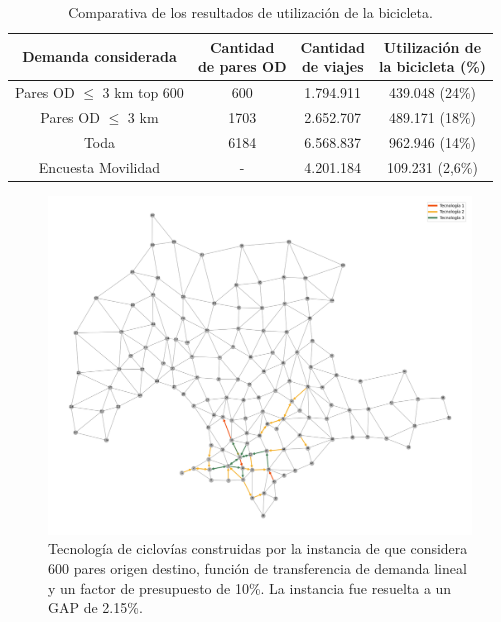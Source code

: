 \begin{table}[h!]
  \centering
  \begin{tabular}{cccc}
    \toprule
      Demanda considerada & \shortstack{Cantidad \\ de pares OD} & \shortstack{Cantidad \\ de viajes} & \shortstack{Utilización de \\ la bicicleta} (\%) \\
    \midrule
      Pares OD $\leq$ 3 km top 600 & 600   & 1.794.911 & 439.048 (24\%)  \\
      Pares OD $\leq$ 3 km         & 1703  & 2.652.707 & 489.171 (18\%)  \\
      Toda                         & 6184  & 6.568.837 & 962.946 (14\%)  \\
    \midrule
      Encuesta Movilidad           & -     & 4.201.184 & 109.231 (2,6\%) \\
    \bottomrule
  \end{tabular}
  \caption{Comparativa de los resultados de utilización de la bicicleta.}
  \label{table:montevideobikeusageresults}
\end{table}

\begin{figure}[h!]
  \centering
  \includegraphics[width=12cm]{../resources/montevideo_d3000.0_linear_0.1_budget_factor_infras.png}
    \caption{Tecnología de ciclovías construidas por la instancia de que considera 600 pares origen destino, función de transferencia de demanda lineal y un factor de presupuesto de 10\%. La instancia fue resuelta a un GAP de 2.15\%.}
  \label{fig:montevideolowbudgetinstance}
\end{figure}

